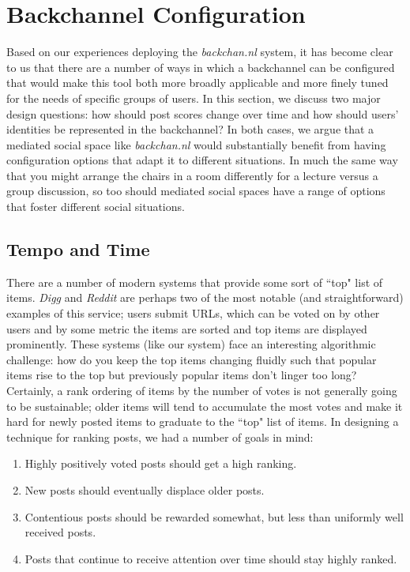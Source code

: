 \section{Backchannel Configuration}
Based on our experiences deploying the \emph{backchan.nl} system, it has become clear to us that there are a number of ways in which a backchannel can be configured that would make this tool both more broadly applicable and more finely tuned for the needs of specific groups of users. In this section, we discuss two major design questions: how should post scores change over time and how should users' identities be represented in the backchannel? In both cases, we argue that a mediated social space like \emph{backchan.nl} would substantially benefit from having configuration options that adapt it to different situations. In much the same way that you might arrange the chairs in a room differently for a lecture versus a group discussion, so too should mediated social spaces have a range of options that foster different social situations.

\subsection{Tempo and Time}

There are a number of modern systems that provide some sort of ``top" list of items. \emph{Digg} and \emph{Reddit} are perhaps two of the most notable (and straightforward) examples of this service; users submit URLs, which can be voted on by other users and by some metric the items are sorted and top items are displayed prominently. These systems (like our system) face an interesting algorithmic challenge: how do you keep the top items changing fluidly such that popular items rise to the top but previously popular items don't linger too long? Certainly, a rank ordering of items by the number of votes is not generally going to be sustainable; older items will tend to accumulate the most votes and make it hard for newly posted items to graduate to the ``top" list of items. In designing a technique for ranking posts, we had a number of goals in mind:

\begin{enumerate}
\item{Highly positively voted posts should get a high ranking.}
\item{New posts should eventually displace older posts.}
\item{Contentious posts should be rewarded somewhat, but less than uniformly well received posts.}
\item{Posts that continue to receive attention over time should stay highly ranked.}
\end{enumerate}

